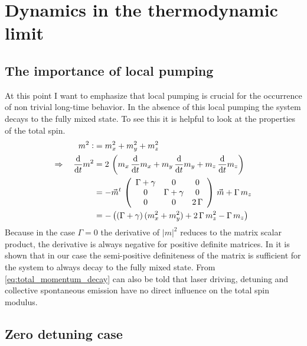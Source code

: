 \chapter{Dynamics in the thermodynamic limit}\label{ch:mean_field_analysis}
\section{The importance of local pumping}
At this point I want to emphasize that local pumping is crucial for the occurrence of non trivial long-time behavior. In the absence of this local pumping the system decays to the fully mixed state. To see this it is helpful to look at the properties of the total spin.
\begin{align}\label{eq:total_momentum_decay}
    m^2\vcentcolon&=m_x^2+m_y^2+m_z^2\notag\\
    \Rightarrow\quad\frac{\text{d}}{\text{d}t} m^2&=2\,\left( m_x\,\frac{\text{d}}{\text{d}t} m_x +m_y\,\frac{\text{d}}{\text{d}t} m_y +m_z\,\frac{\text{d}}{\text{d}t} m_z \right)\notag\\
    &=-\vec{m}^t\,\left( \begin{array}{ccc}
        \Gamma+\gamma & 0&0  \\
        0& \Gamma+\gamma & 0\\
        0&0&2\,\Gamma
   \end{array}\right)\,\vec{m}+\Gamma\,m_z\notag\\
   &=-\left(  (\Gamma+\gamma)\,(m_x^2+m_y^2)+2\,\Gamma\,m_z^2-\Gamma\,m_z \right)
\end{align}
Because in the case $\Gamma=0$ the derivative of $|m|^2$ reduces to the matrix scalar product, the derivative is always negative for positive definite matrices.  In  it is shown that in our case the semi-positive definiteness of the matrix is sufficient for the system to always decay to the fully mixed state. From \eqref{eq:total_momentum_decay} can also be told that laser driving, detuning and collective spontaneous emission have no direct influence on the total spin modulus.

\section{Zero detuning case}\label{sec:zero_detuning}
